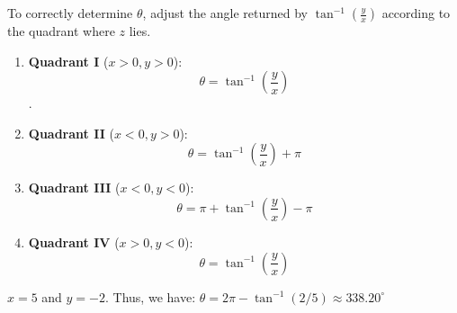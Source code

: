 \documentclass[a4paper, 10pt]{article}
\begin{document}
To correctly determine \( \theta \), adjust the angle returned by \(\tan^{-1}\left(\frac{y}{x}\right)\) according to the quadrant where \( z \) lies.

\begin{enumerate}
  \item \textbf{Quadrant I} (\( x > 0, y > 0 \)):
        \[
          \theta = \tan^{-1}\left(\frac{y}{x}\right)
        \]
        .

  \item \textbf{Quadrant II} (\( x < 0, y > 0 \)):
        \[
          \theta =  \tan^{-1}\left(\frac{y}{x}\right) + \pi
        \]


  \item \textbf{Quadrant III} (\( x < 0, y < 0 \)):
        \[
          \theta = \pi + \tan^{-1}\left(\frac{y}{x}\right) - \pi
        \]

  \item \textbf{Quadrant IV} (\( x > 0, y < 0 \)):
        \[
          \theta = \tan^{-1}\left(\frac{y}{x}\right)
        \]
\end{enumerate}

\begin{examplebox}[Let $z = 5 - 2i$]
  $x = 5$ and $y = -2$. Thus, we have:
  $\theta = 2\pi - \tan^{-1}({2/5}) \approx 338.20^\circ$
  \begin{center}
  \end{center}

\end{examplebox}
\end{document}
